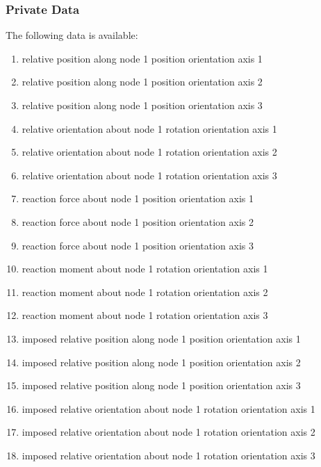 \subsubsection{Private Data}
The following data is available:
\begin{enumerate}
\item {} relative position along node 1 position orientation axis 1
\item {} relative position along node 1 position orientation axis 2
\item {} relative position along node 1 position orientation axis 3
\item {} relative orientation about node 1 rotation orientation axis 1
\item {} relative orientation about node 1 rotation orientation axis 2
\item {} relative orientation about node 1 rotation orientation axis 3
\item {} reaction force about node 1 position orientation axis 1
\item {} reaction force about node 1 position orientation axis 2
\item {} reaction force about node 1 position orientation axis 3
\item {} reaction moment about node 1 rotation orientation axis 1
\item {} reaction moment about node 1 rotation orientation axis 2
\item {} reaction moment about node 1 rotation orientation axis 3
\item {} imposed relative position along node 1 position orientation axis 1
\item {} imposed relative position along node 1 position orientation axis 2
\item {} imposed relative position along node 1 position orientation axis 3
\item {} imposed relative orientation about node 1 rotation orientation axis 1
\item {} imposed relative orientation about node 1 rotation orientation axis 2
\item {} imposed relative orientation about node 1 rotation orientation axis 3
\end{enumerate}

